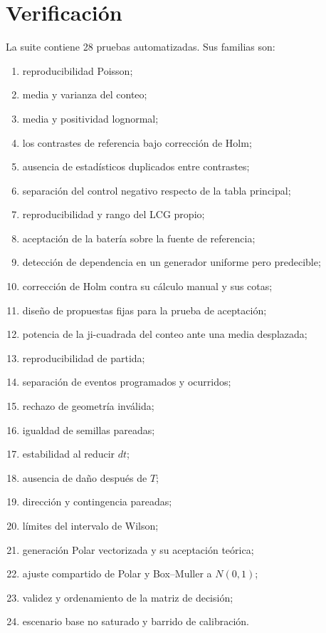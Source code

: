 \documentclass[11pt,a4paper]{article}
\begin{document}
\section{Verificación}

La suite contiene 28 pruebas automatizadas. Sus familias son:

\begin{enumerate}
  \item reproducibilidad Poisson;
  \item media y varianza del conteo;
  \item media y positividad lognormal;
  \item los \TestCount{} contrastes de referencia bajo corrección de Holm;
  \item ausencia de estadísticos duplicados entre contrastes;
  \item separación del control negativo respecto de la tabla principal;
  \item reproducibilidad y rango del LCG propio;
  \item aceptación de la batería sobre la fuente de referencia;
  \item detección de dependencia en un generador uniforme pero predecible;
  \item corrección de Holm contra su cálculo manual y sus cotas;
  \item diseño de propuestas fijas para la prueba de aceptación;
  \item potencia de la ji-cuadrada del conteo ante una media desplazada;
  \item reproducibilidad de partida;
  \item separación de eventos programados y ocurridos;
  \item rechazo de geometría inválida;
  \item igualdad de semillas pareadas;
  \item estabilidad al reducir $dt$;
  \item ausencia de daño después de $T$;
  \item dirección y contingencia pareadas;
  \item límites del intervalo de Wilson;
  \item generación Polar vectorizada y su aceptación teórica;
  \item ajuste compartido de Polar y Box--Muller a $N(0,1)$;
  \item validez y ordenamiento de la matriz de decisión;
  \item escenario base no saturado y barrido de calibración.
\end{enumerate}
\end{document}
